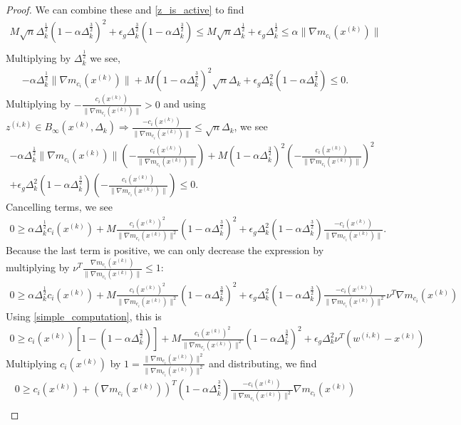\documentclass{article}
\theoremstyle{case}
\newcommand{\xk}{{x^{(k)}}}
\newcommand{\dk}{\Delta_k}
\newcommand{\zik}{{z^{(i, k)}}}
\newcommand{\wik}{{w^{(i, k)}}}
\newcommand{\gmcik}{{\nabla m_{c_i}(\xk)}}
\newcommand{\tr}{{ B_{\infty}\left(\xk, \dk\right) }}
\begin{document}
\begin{proof}
We can combine these and \cref{z_is_active} to find 
\begin{align*}
M \sqrt{n}\dk^{\frac 1 2}\left(1 - \alpha \dk^{\frac 3 2 }\right)^2  + \epsilon_g \dk^{\frac 3 2} \left(1 - \alpha \dk^{\frac 3 2 }\right) \le M \sqrt{n}\dk^{\frac 1 2} + \epsilon_g \dk^{\frac 1 2} \le \alpha \|\gmcik\| \\
\end{align*}
Multiplying by $\dk^{\frac 1 2}$ we see,
\begin{align*}
-\alpha \dk^{\frac 1 2 }\|\gmcik\| + M \left(1 - \alpha \dk^{\frac 3 2 }\right)^2 \sqrt{n}\dk+ \epsilon_g \dk^2 \left(1 - \alpha \dk^{\frac 3 2 }\right) \le  0.
\end{align*}
Multiplying by $-\frac{c_i(\xk)}{\|\gmcik\|} > 0$ and using $\zik \in \tr \Longrightarrow \frac{-c_i(\xk)}{\|\gmcik\|} \le \sqrt{n}\dk$, we see
\begin{align*}
-\alpha \dk^{\frac 1 2 }\|\gmcik\|\left(-\frac{c_i(\xk)}{\|\gmcik\|}\right) + M \left(1 - \alpha \dk^{\frac 3 2 }\right)^2 \left(-\frac{c_i(\xk)}{\|\gmcik\|}\right)^2\\
+\epsilon_g \dk^2 \left(1 - \alpha \dk^{\frac 3 2 }\right)\left(-\frac{c_i(\xk)}{\|\gmcik\|}\right) \le 0.
\end{align*}
Cancelling terms, we see
\begin{align*}
0 \ge \alpha \dk^{\frac 1 2 } c_i(\xk) + M \frac {c_i(\xk)^2}{\|\gmcik\|^2}\left(1 - \alpha \dk^{\frac 3 2 }\right)^2 + \epsilon_g \dk^2 \left(1 - \alpha \dk^{\frac 3 2 }\right)\frac{-c_i(\xk)}{\|\gmcik\|}.
\end{align*}
Because the last term is positive, we can only decrease the expression by multiplying by $\nu^T \frac{\gmcik}{\|\gmcik\|} \le 1$:
\begin{align*}
0\ge \alpha \dk^{\frac 1 2 } c_i(\xk) + M \frac {c_i(\xk)^2}{\|\gmcik\|^2}\left(1 - \alpha \dk^{\frac 3 2 }\right)^2 + \epsilon_g \dk^2 \left(1 - \alpha \dk^{\frac 3 2 }\right)\frac{-c_i(\xk)}{\|\gmcik\|^2}\nu^T\gmcik
\end{align*}
Using \cref{simple_computation}, this is
\begin{align*}
0 \ge c_i(\xk)\left[1 - \left(1 - \alpha \dk^{\frac 3 2 }\right)\right] + M \frac {c_i(\xk)^2}{\|\gmcik\|^2}\left(1 - \alpha \dk^{\frac 3 2 }\right)^2 + \epsilon_g \dk^2\nu^T \left(\wik - \xk\right)
\end{align*}
Multiplying $c_i(\xk)$ by $1 = \frac{\|\gmcik\|^2}{\|\gmcik\|^2}$ and distributing, we find
\begin{align*}
0 \ge c_i(\xk) + \left(\gmcik\right)^T\left(1 - \alpha \dk^{\frac 3 2 }\right)\frac{-c_i(\xk)}{\|\gmcik\|^2}\gmcik  \\

\end{align*}
\end{proof}
\end{document}
